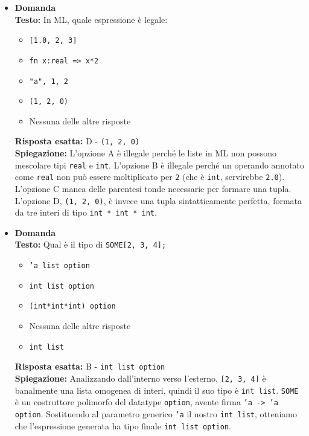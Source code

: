 \documentclass[12pt, a4paper]{article}
\newcounter{domandateoria}
\begin{document}
\begin{itemize}
    \item {}\textbf{Domanda \thedomandateoria} \\
    \textbf{Testo:} In ML, quale espressione è legale:
    \begin{itemize}
        \item[A)] \texttt{[1.0, 2, 3]}
        \item[B)] \texttt{fn x:real => x*2}
        \item[C)] \texttt{"a", 1, 2}
        \item[D)] \texttt{(1, 2, 0)}
        \item[E)] Nessuna delle altre risposte
    \end{itemize}
    \textbf{Risposta esatta:} D - \texttt{(1, 2, 0)} \\
    \textbf{Spiegazione:} L'opzione A è illegale perché le liste in ML non possono mescolare tipi \texttt{real} e \texttt{int}. L'opzione B è illegale perché un operando annotato come \texttt{real} non può essere moltiplicato per \texttt{2} (che è \texttt{int}, servirebbe \texttt{2.0}). L'opzione C manca delle parentesi tonde necessarie per formare una tupla. L'opzione D, \texttt{(1, 2, 0)}, è invece una tupla sintatticamente perfetta, formata da tre interi di tipo \texttt{int * int * int}.
    \vspace{0.3cm}

\newpage

    \item {}\textbf{Domanda \thedomandateoria} \\
    \textbf{Testo:} Qual è il tipo di \texttt{SOME[2, 3, 4];}
    \begin{itemize}
        \item[A)] \texttt{'a list option}
        \item[B)] \texttt{int list option}
        \item[C)] \texttt{(int*int*int) option}
        \item[D)] Nessuna delle altre risposte
        \item[E)] \texttt{int list}
    \end{itemize}
    \textbf{Risposta esatta:} B - \texttt{int list option} \\
    \textbf{Spiegazione:} Analizzando dall'interno verso l'esterno, \texttt{[2, 3, 4]} è banalmente una lista omogenea di interi, quindi il suo tipo è \texttt{int list}. \texttt{SOME} è un costruttore polimorfo del datatype \texttt{option}, avente firma \texttt{'a -> 'a option}. Sostituendo al parametro generico \texttt{'a} il nostro \texttt{int list}, otteniamo che l'espressione generata ha tipo finale \texttt{int list option}.
    \vspace{0.3cm}
\end{itemize}
\end{document}
